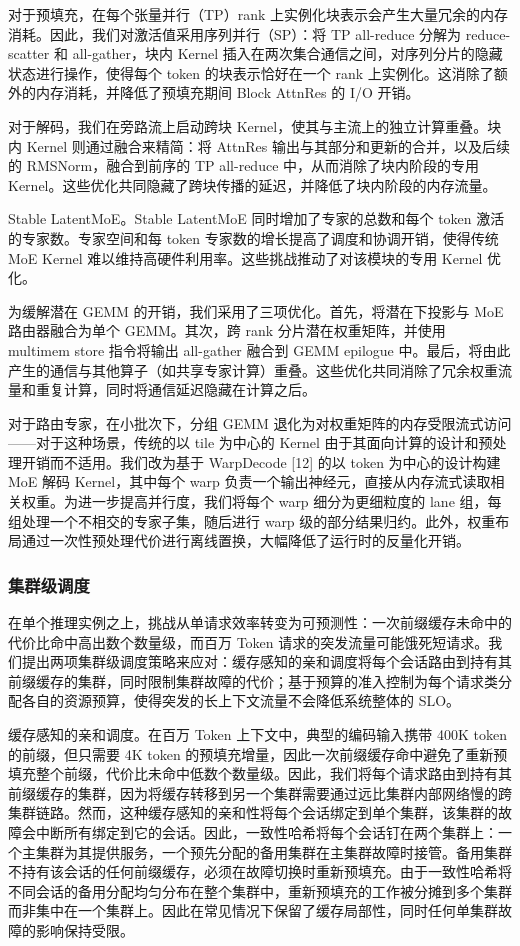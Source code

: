 对于预填充，在每个张量并行（TP）rank 上实例化块表示会产生大量冗余的内存消耗。因此，我们对激活值采用序列并行（SP）：将 TP all-reduce 分解为 reduce-scatter 和 all-gather，块内 Kernel 插入在两次集合通信之间，对序列分片的隐藏状态进行操作，使得每个 token 的块表示恰好在一个 rank 上实例化。这消除了额外的内存消耗，并降低了预填充期间 Block AttnRes 的 I/O 开销。

对于解码，我们在旁路流上启动跨块 Kernel，使其与主流上的独立计算重叠。块内 Kernel 则通过融合来精简：将 AttnRes 输出与其部分和更新的合并，以及后续的 RMSNorm，融合到前序的 TP all-reduce 中，从而消除了块内阶段的专用 Kernel。这些优化共同隐藏了跨块传播的延迟，并降低了块内阶段的内存流量。

Stable LatentMoE。Stable LatentMoE 同时增加了专家的总数和每个 token 激活的专家数。专家空间和每 token 专家数的增长提高了调度和协调开销，使得传统 MoE Kernel 难以维持高硬件利用率。这些挑战推动了对该模块的专用 Kernel 优化。

为缓解潜在 GEMM 的开销，我们采用了三项优化。首先，将潜在下投影与 MoE 路由器融合为单个 GEMM。其次，跨 rank 分片潜在权重矩阵，并使用 multimem store 指令将输出 all-gather 融合到 GEMM epilogue 中。最后，将由此产生的通信与其他算子（如共享专家计算）重叠。这些优化共同消除了冗余权重流量和重复计算，同时将通信延迟隐藏在计算之后。

对于路由专家，在小批次下，分组 GEMM 退化为对权重矩阵的内存受限流式访问——对于这种场景，传统的以 tile 为中心的 Kernel 由于其面向计算的设计和预处理开销而不适用。我们改为基于 WarpDecode {[}12{]} 的以 token 为中心的设计构建 MoE 解码 Kernel，其中每个 warp 负责一个输出神经元，直接从内存流式读取相关权重。为进一步提高并行度，我们将每个 warp 细分为更细粒度的 lane 组，每组处理一个不相交的专家子集，随后进行 warp 级的部分结果归约。此外，权重布局通过一次性预处理代价进行离线置换，大幅降低了运行时的反量化开销。

\subsubsection{集群级调度}\label{fleet-level-scheduling}

在单个推理实例之上，挑战从单请求效率转变为可预测性：一次前缀缓存未命中的代价比命中高出数个数量级，而百万 Token 请求的突发流量可能饿死短请求。我们提出两项集群级调度策略来应对：缓存感知的亲和调度将每个会话路由到持有其前缀缓存的集群，同时限制集群故障的代价；基于预算的准入控制为每个请求类分配各自的资源预算，使得突发的长上下文流量不会降低系统整体的 SLO。

缓存感知的亲和调度。在百万 Token 上下文中，典型的编码输入携带 400K token 的前缀，但只需要 4K token 的预填充增量，因此一次前缀缓存命中避免了重新预填充整个前缀，代价比未命中低数个数量级。因此，我们将每个请求路由到持有其前缀缓存的集群，因为将缓存转移到另一个集群需要通过远比集群内部网络慢的跨集群链路。然而，这种缓存感知的亲和性将每个会话绑定到单个集群，该集群的故障会中断所有绑定到它的会话。因此，一致性哈希将每个会话钉在两个集群上：一个主集群为其提供服务，一个预先分配的备用集群在主集群故障时接管。备用集群不持有该会话的任何前缀缓存，必须在故障切换时重新预填充。由于一致性哈希将不同会话的备用分配均匀分布在整个集群中，重新预填充的工作被分摊到多个集群而非集中在一个集群上。因此在常见情况下保留了缓存局部性，同时任何单集群故障的影响保持受限。


